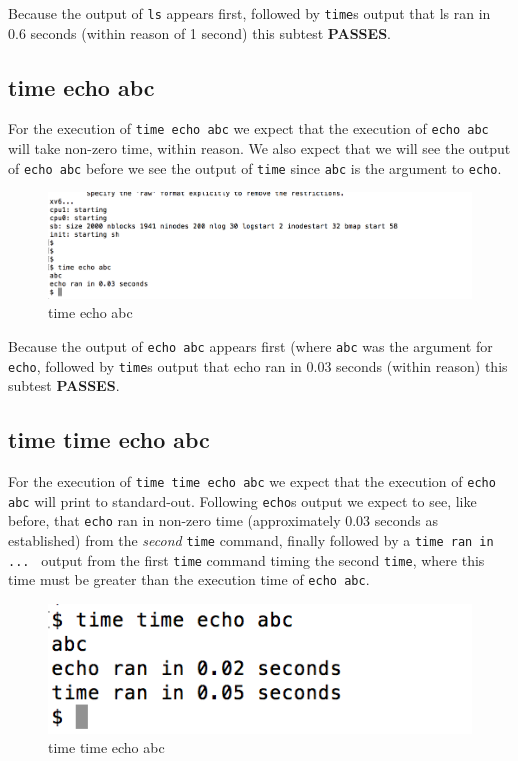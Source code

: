 \documentclass[11pt,letterpaper]{report}
\begin{document}
	Because the output of {\tt ls} appears first, followed by {\tt time}s output that ls ran in 0.6 seconds (within reason of 1 second) this subtest \textbf{PASSES}.
	
\subsection*{time echo abc}
	For the execution of {\tt time echo abc} we expect that the execution of {\tt echo abc} will take non-zero time, within reason. We also expect that we will
	see the output of {\tt echo abc} before we see the output of {\tt time} since {\tt abc} is the argument to {\tt echo}.
	
\begin{figure}[h!]
\centering
\includegraphics[width=.9\linewidth]{time-echo.png}
\caption[timels]{time echo abc}
\label{fig:timels}
\end{figure}
	
	Because the output of {\tt echo abc} appears first (where {\tt abc} was the argument for {\tt echo}, followed by {\tt time}s output that echo ran in 0.03 seconds (within reason) this subtest \textbf{PASSES}.
	
\newpage

\subsection*{time time echo abc}
	For the execution of {\tt time time echo abc} we expect that the execution of {\tt echo abc} will print to standard-out. Following {\tt echo}s output we expect to see, like before,
	that {\tt echo} ran in non-zero time (approximately 0.03 seconds as established) from the \emph{second} {\tt time} command, finally followed by a {\tt time ran in ... } output from the
	first {\tt time} command timing the second {\tt time}, where this time must be greater than the execution time of {\tt echo abc}.
	
\begin{figure}[h!]
\centering
\includegraphics[width=.7\linewidth]{time-time.png}
\caption[timetimels]{time time echo abc}
\label{fig:timetimeecho}
\end{figure}
	
\end{document}
